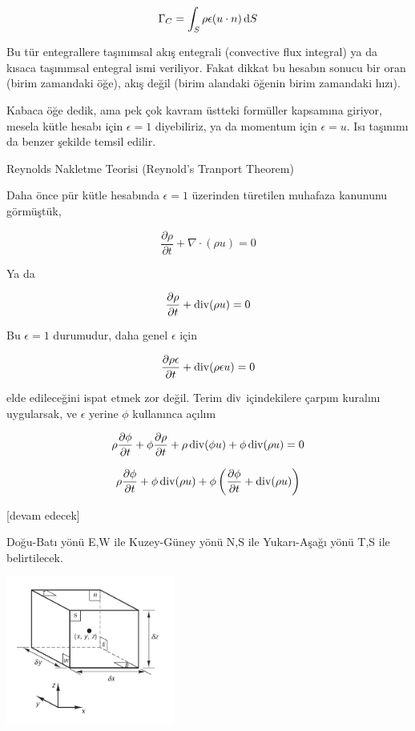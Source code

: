 \documentclass[12pt,fleqn]{article}\usepackage{../../common}
\begin{document}
$$
\Gamma_C = \int_S \rho \epsilon (u \cdot n) \,\mathrm{d} S
$$

Bu tür entegrallere taşınımsal akış entegrali (convective flux integral) ya da
kısaca taşınımsal entegral ismi veriliyor. Fakat dikkat bu hesabın sonucu bir
oran (birim zamandaki öğe), akış değil (birim alandaki öğenin birim zamandaki
hızı).

Kabaca öğe dedik, ama pek çok kavram üstteki formüller kapsamına giriyor, mesela
kütle hesabı için $\epsilon = 1$ diyebiliriz, ya da momentum için $\epsilon =
u$. Isı taşınımı da benzer şekilde temsil edilir.

Reynolds Nakletme Teorisi (Reynold's Tranport Theorem)

Daha önce pür kütle hesabında $\epsilon = 1$ üzerinden türetilen muhafaza
kanununu görmüştük,

$$
\frac{\partial \rho}{\partial t} + \nabla \cdot (\rho u ) = 0
$$

Ya da 

$$
\frac{\partial \rho}{\partial t} + \operatorname{div} (\rho u ) = 0
$$

Bu $\epsilon = 1$ durumudur, daha genel $\epsilon$ için

$$
\frac{\partial \rho \epsilon}{\partial t} + \operatorname{div} (\rho \epsilon u ) = 0
$$

elde edileceğini ispat etmek zor değil. Terim $\operatorname{div}$ içindekilere çarpım
kuralını uygularsak, ve $\epsilon$ yerine $\phi$ kullanınca açılım

$$
\rho \frac{\partial \phi}{\partial t} +
\phi \frac{\partial \rho}{\partial t} + 
\rho \operatorname{div} (\phi u ) +
\phi \operatorname{div} (\rho u ) = 0
$$

$$
\rho \frac{\partial \phi}{\partial t} +
\phi \operatorname{div} (\rho u ) +
\phi \left(
  \frac{\partial \phi}{\partial t} + \operatorname{div} (\rho u ) 
\right)
$$









[devam edecek]


Doğu-Batı yönü E,W ile Kuzey-Güney yönü N,S ile Yukarı-Aşağı yönü T,S
ile belirtilecek. 

\includegraphics[width=15em]{phy_030_fluid2_03.png}
\end{document}
